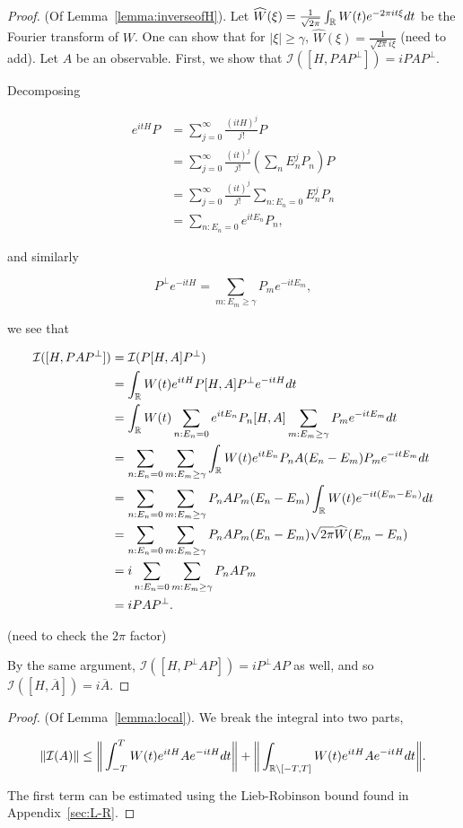 \documentclass[12pt, letterpaper]{article}
\begin{document}
\begin{proof}
(Of Lemma~\ref{lemma:inverseofH}). Let $\widehat{W}(\xi) = \frac{1}{\sqrt{2\pi}}\int_{\mathbb{R}} W(t) e^{-2\pi i t \xi} dt$ be the Fourier transform of $W$. One can show that for $|\xi|\geq \gamma$, $\widehat{W}(\xi) = \frac{1}{\sqrt{2\pi}i \xi}$ (need to add). Let $A$ be an observable. First, we show that $\mathcal{I}([H,PAP^\perp]) = iPAP^\perp$. 

Decomposing 

\[\begin{aligned}
e^{itH}P &= \sum_{j=0}^\infty \frac{(itH)^j}{j!} P \\
&= \sum_{j =0}^\infty \frac{(it)^j}{j!} \left(\sum_n E_n^j P_n\right)P \\
&= \sum_{j=0}^\infty \frac{(it)^j}{j!} \sum_{n : E_n=0} E_n^j P_n \\
&= \sum_{n : E_n=0} e^{itE_n}P_n,
\end{aligned}\]

and similarly 

\[P^\perp e^{-itH}= \sum_{m:E_m \geq \gamma}P_m e^{-itE_m},\]

we see that

\[\begin{aligned}
\mathcal{I}([H,PAP^\perp]) &= \mathcal{I}(P[H,A]P^\perp) \\
&= \int_{\mathbb{R}} W(t)e^{itH}P[H,A]P^\perp e^{-itH}dt \\
&= \int_{\mathbb{R}} W(t) \sum_{n : E_n=0} e^{itE_n}P_n [H,A] \sum_{m:E_m \geq \gamma} P_m e^{-itE_m} dt\\
&= \sum_{n : E_n=0} \sum_{m:E_m \geq \gamma} \int_{\mathbb{R}} W(t) e^{itE_n} P_n A (E_n-E_m) P_m e^{-itE_m}dt\\
&= \sum_{n : E_n=0} \sum_{m:E_m \geq \gamma} P_n A P_m (E_n-E_m) \int_{\mathbb{R}} W(t) e^{-it(E_m - E_n)} dt\\
&= \sum_{n : E_n=0} \sum_{m:E_m \geq \gamma} P_n A P_m (E_n-E_m) \sqrt{2\pi} \widehat{W}(E_m-E_n) \\
&= i\sum_{n : E_n=0} \sum_{m:E_m \geq \gamma} P_n A P_m\\
&= iPAP^\perp.
\end{aligned}\]

(need to check the $2\pi$ factor)

By the same argument, $\mathcal{I}([H,P^\perp AP]) = iP^\perp AP$ as well, and so $\mathcal{I}([H,\overline{A}]) = i\overline{A}$.
\end{proof}

\begin{proof}

(Of Lemma~\ref{lemma:local}). We break the integral into two parts,

\[\lVert \mathcal{I}(A) \rVert \leq \bigg\lVert\int_{-T}^T W(t) e^{itH}Ae^{-itH}dt \bigg\rVert + \bigg\lVert \int_{\mathbb{R}\setminus [-T,T]} W(t) e^{itH}Ae^{-itH}dt\bigg\rVert.\]

The first term can be estimated using the Lieb-Robinson bound found in Appendix~\ref{sec:L-R}.

\end{proof}
\end{document}
